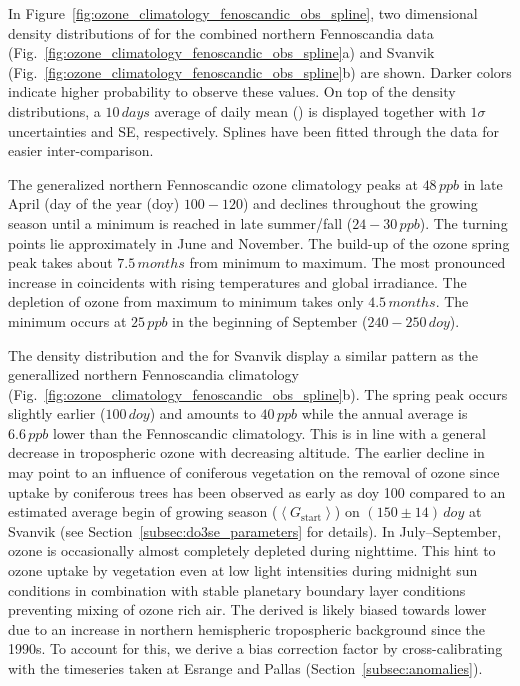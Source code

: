 \documentclass[bg, manuscript]{copernicus}
\begin{document}
In Figure~\ref{fig:ozone_climatology_fenoscandic_obs_spline}, two dimensional density distributions of \chem{[O_3]} for the combined northern Fennoscandia data (Fig.~\ref{fig:ozone_climatology_fenoscandic_obs_spline}a) and Svanvik (Fig.~\ref{fig:ozone_climatology_fenoscandic_obs_spline}b) are shown. Darker colors indicate higher probability to observe these values. On top of the density distributions, a $10\,\unit{days}$ average of daily mean () is displayed together with $1 \sigma$ uncertainties and SE, respectively. Splines have been fitted through the data for easier inter-comparison.

The generalized northern Fennoscandic ozone climatology peaks at $48\,\unit{ppb}$  in late April (day of the year (doy) $100-120$) and declines throughout the growing season until a minimum is reached in late summer/fall ($24-30\,\unit{ppb}$). The turning points lie approximately in June and November. The build-up of the ozone spring peak takes about $7.5\,\unit{months}$ from minimum to maximum. The most pronounced increase in \chem{\left<[O_3]\right>} coincidents with rising temperatures and global irradiance. The depletion of ozone from maximum to minimum takes only $4.5\,\unit{months}$. The minimum occurs at $25\,\unit{ppb}$ in the beginning of September ($240-250\,\unit{doy}$).

The \chem{[O_3]} density distribution and the  for Svanvik display a similar pattern as the generallized northern Fennoscandia climatology (Fig.~\ref{fig:ozone_climatology_fenoscandic_obs_spline}b). The spring peak occurs slightly earlier ($100\,\unit{doy}$) and amounts to $40\,\unit{ppb}$ while the annual average \chem{\left<[O_3]\right>} is $6.6\,\unit{ppb}$ lower than the Fennoscandic climatology. This is in line with a general decrease in tropospheric ozone with decreasing altitude. The earlier decline in \chem{\left<[O_3]\right>} may point to an influence of coniferous vegetation on the removal of ozone since  uptake by coniferous trees has been observed as early as \unit{doy} 100 \citep{TB:Kolari2007, TP:Wallin2013} compared to an estimated average begin of growing season ($\left<G_\mathrm{start}\right>$) on $(150\pm 14)\,\unit{doy}$ at Svanvik (see Section~\ref{subsec:do3se_parameters} for details). In July--September, ozone is occasionally almost completely depleted during nighttime. This hint to ozone uptake by vegetation even at low light intensities during midnight sun conditions in combination with stable planetary boundary layer conditions preventing mixing of ozone rich air. The derived \chem{\left<[O_3]\right>} is likely biased towards lower \chem{[O_3]} due to an increase in northern hemispheric tropospheric background \chem{[O_3]} since the 1990s. To account for this, we derive a bias correction factor by cross-calibrating with the timeseries taken at Esrange and Pallas (Section~\ref{subsec:anomalies}).
\end{document}
